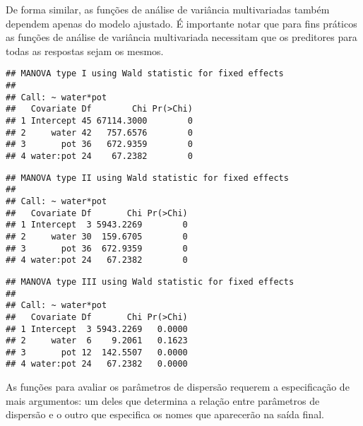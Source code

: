 De forma similar, as funções de análise de variância multivariadas também dependem apenas do modelo ajustado. É importante notar que para fins práticos as funções de análise de variância multivariada necessitam que os preditores para todas as respostas sejam os mesmos.

\begin{knitrout}
\color{fgcolor}\begin{kframe}
\begin{alltt}
\end{alltt}
\begin{verbatim}
## MANOVA type I using Wald statistic for fixed effects
## 
## Call: ~ water*pot
##   Covariate Df        Chi Pr(>Chi)
## 1 Intercept 45 67114.3000        0
## 2     water 42   757.6576        0
## 3       pot 36   672.9359        0
## 4 water:pot 24    67.2382        0
\end{verbatim}
\begin{alltt}
\end{alltt}
\begin{verbatim}
## MANOVA type II using Wald statistic for fixed effects
## 
## Call: ~ water*pot
##   Covariate Df       Chi Pr(>Chi)
## 1 Intercept  3 5943.2269        0
## 2     water 30  159.6705        0
## 3       pot 36  672.9359        0
## 4 water:pot 24   67.2382        0
\end{verbatim}
\begin{alltt}
\end{alltt}
\begin{verbatim}
## MANOVA type III using Wald statistic for fixed effects
## 
## Call: ~ water*pot
##   Covariate Df       Chi Pr(>Chi)
## 1 Intercept  3 5943.2269   0.0000
## 2     water  6    9.2061   0.1623
## 3       pot 12  142.5507   0.0000
## 4 water:pot 24   67.2382   0.0000
\end{verbatim}
\end{kframe}
\end{knitrout}

As funções para avaliar os parâmetros de dispersão requerem a especificação de mais argumentos: um deles que determina a relação entre parâmetros de dispersão e o outro que especifica os nomes que aparecerão na saída final.

